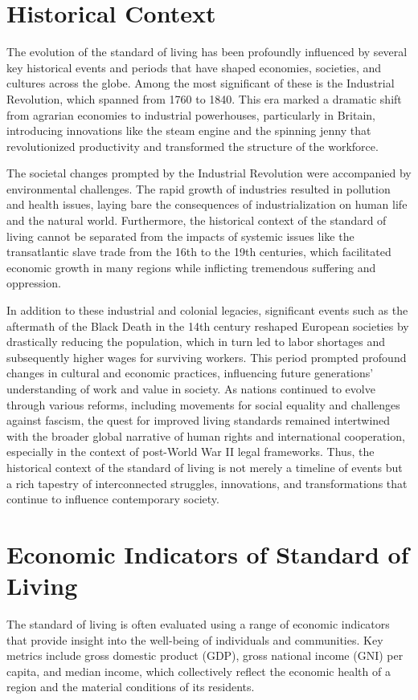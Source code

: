 \documentclass[12pt]{article}
\begin{document}
\section{Historical Context}
The evolution of the standard of living has been profoundly influenced by several key historical events and periods that have shaped economies, societies, and cultures across the globe. Among the most significant of these is the Industrial Revolution, which spanned from 1760 to 1840. This era marked a dramatic shift from agrarian economies to industrial powerhouses, particularly in Britain, introducing innovations like the steam engine and the spinning jenny that revolutionized productivity and transformed the structure of the workforce.

The societal changes prompted by the Industrial Revolution were accompanied by environmental challenges. The rapid growth of industries resulted in pollution and health issues, laying bare the consequences of industrialization on human life and the natural world. Furthermore, the historical context of the standard of living cannot be separated from the impacts of systemic issues like the transatlantic slave trade from the 16th to the 19th centuries, which facilitated economic growth in many regions while inflicting tremendous suffering and oppression.

In addition to these industrial and colonial legacies, significant events such as the aftermath of the Black Death in the 14th century reshaped European societies by drastically reducing the population, which in turn led to labor shortages and subsequently higher wages for surviving workers. This period prompted profound changes in cultural and economic practices, influencing future generations' understanding of work and value in society.
As nations continued to evolve through various reforms, including movements for social
equality and challenges against fascism, the quest for improved living standards
remained intertwined with the broader global narrative of human rights and international
cooperation, especially in the context of post-World War II legal frameworks.
Thus, the historical context of the standard of living is not merely a timeline of events
but a rich tapestry of interconnected struggles, innovations, and transformations that
continue to influence contemporary society.

\section{Economic Indicators of Standard of Living}
The standard of living is often evaluated using a range of economic indicators that provide insight into the well-being of individuals and communities. Key metrics include gross domestic product (GDP), gross national income (GNI) per capita, and median income, which collectively reflect the economic health of a region and the material conditions of its residents.
\end{document}
